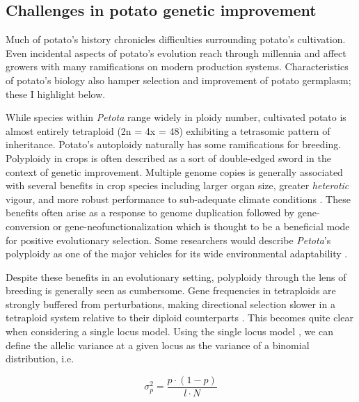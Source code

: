 \begin{refsection}
\subsection{Challenges in potato genetic
improvement}\label{challenges-in-potato-genetic-improvement}

Much of potato's history chronicles difficulties surrounding potato's
cultivation. Even incidental aspects of potato's evolution reach through
millennia and affect growers with many ramifications on modern
production systems. Characteristics of potato's biology also hamper
selection and improvement of potato germplasm; these I highlight below.

While species within \emph{Petota} range widely in ploidy number,
cultivated potato is almost entirely tetraploid (2n = 4x = 48)
exhibiting a tetrasomic pattern of inheritance. Potato's autoploidy
naturally has some ramifications for breeding. Polyploidy in crops is
often described as a sort of double-edged sword in the context of
genetic improvement. Multiple genome copies is generally associated with
several benefits in crop species including larger organ size, greater
\emph{heterotic} vigour, and more robust performance to sub-adequate
climate conditions \parencite{Osborn2003,Renny-Byfield2014}. These
benefits often arise as a response to genome duplication followed by
gene-conversion or gene-neofunctionalization which is thought to be a
beneficial mode for positive evolutionary selection. Some researchers
would describe \emph{Petota}'s polyploidy as one of the major vehicles
for its wide environmental adaptability \parencite{Hijmans2007,Tai2025}.

Despite these benefits in an evolutionary setting, polyploidy through
the lens of breeding is generally seen as cumbersome. Gene frequencies
in tetraploids are strongly buffered from perturbations, making
directional selection slower in a tetraploid system relative to their
diploid counterparts \parencite{Osborn2003}. This becomes quite clear
when considering a single locus model. Using the single locus model
\parencite{Bernardo2002a}, we can define the allelic variance at a given
locus as the variance of a binomial distribution, i.e.

\[ \sigma^2_p = \frac{p\cdot (1-p)}{l \cdot N} \]


\end{refsection}
